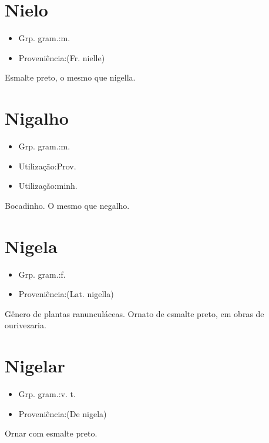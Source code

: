 \section{Nielo}
\begin{itemize}
\item {Grp. gram.:m.}
\end{itemize}
\begin{itemize}
\item {Proveniência:(Fr. \textunderscore nielle\textunderscore )}
\end{itemize}
Esmalte preto, o mesmo que nigella.
\section{Nigalho}
\begin{itemize}
\item {Grp. gram.:m.}
\end{itemize}
\begin{itemize}
\item {Utilização:Prov.}
\end{itemize}
\begin{itemize}
\item {Utilização:minh.}
\end{itemize}
Bocadinho.
O mesmo que \textunderscore negalho\textunderscore .
\section{Nigela}
\begin{itemize}
\item {Grp. gram.:f.}
\end{itemize}
\begin{itemize}
\item {Proveniência:(Lat. \textunderscore nigella\textunderscore )}
\end{itemize}
Gênero de plantas ranunculáceas.
Ornato de esmalte preto, em obras de ourivezaria.
\section{Nigelar}
\begin{itemize}
\item {Grp. gram.:v. t.}
\end{itemize}
\begin{itemize}
\item {Proveniência:(De \textunderscore nigela\textunderscore )}
\end{itemize}
Ornar com esmalte preto.
